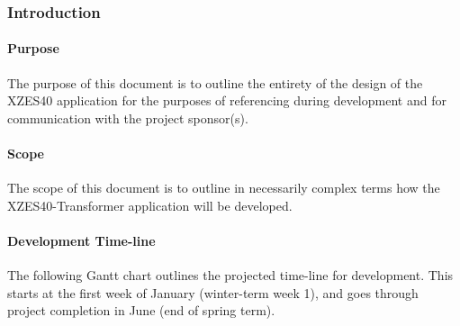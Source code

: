 \subsubsection{Introduction}

\paragraph{Purpose}

The purpose of this document is to outline the entirety of the design of the XZES40 application for the purposes of referencing during development and for communication with the project sponsor(s).

\paragraph{Scope}

The scope of this document is to outline in necessarily complex terms how the XZES40-Transformer application will be developed.

\paragraph{Development Time-line}

The following Gantt chart outlines the projected time-line for development.
This starts at the first week of January (winter-term week 1), and goes through project completion in June (end of spring term).

